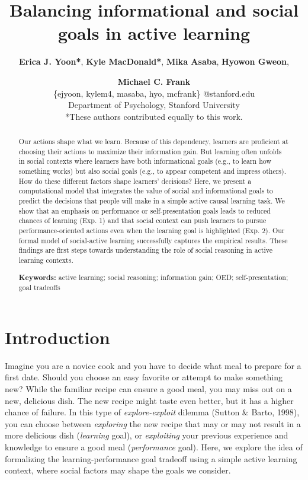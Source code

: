 \documentclass[10pt, letterpaper]{article}
\title{Balancing informational and social goals in active learning}
\author{{\large \bf Erica J. Yoon*}, {\large \bf Kyle MacDonald*}, {\large \bf Mika Asaba}, {\large \bf Hyowon Gweon}, \and {\large \bf Michael C. Frank} \\ \{ejyoon, kylem4, masaba, hyo, mcfrank\} @stanford.edu \\ Department of Psychology, Stanford University \\ *These authors contributed equally to this work.}
\begin{document}
\maketitle

\begin{abstract}
Our actions shape what we learn. Because of this dependency, learners
are proficient at choosing their actions to maximize their information
gain. But learning often unfolds in social contexts where learners have
both informational goals (e.g., to learn how something works) but also
social goals (e.g., to appear competent and impress others). How do
these different factors shape learners' decisions? Here, we present a
computational model that integrates the value of social and
informational goals to predict the decisions that people will make in a
simple active causal learning task. We show that an emphasis on
performance or self-presentation goals leads to reduced chances of
learning (Exp. 1) and that social context can push learners to pursue
performance-oriented actions even when the learning goal is highlighted
(Exp. 2). Our formal model of social-active learning successfully
captures the empirical results. These findings are first steps towards
understanding the role of social reasoning in active learning contexts.

\textbf{Keywords:}
active learning; social reasoning; information gain; OED;
self-presentation; goal tradeoffs
\end{abstract}

\section{Introduction}\label{introduction}

Imagine you are a novice cook and you have to decide what meal to
prepare for a first date. Should you choose an easy favorite or attempt
to make something new? While the familiar recipe can ensure a good meal,
you may miss out on a new, delicious dish. The new recipe might taste
even better, but it has a higher chance of failure. In this type of
\emph{explore-exploit} dilemma (Sutton \& Barto, 1998), you can choose
between \emph{exploring} the new recipe that may or may not result in a
more delicious dish (\emph{learning} goal), or \emph{exploiting} your
previous experience and knowledge to ensure a good meal
(\emph{performance} goal). Here, we explore the idea of formalizing the
learning-performance goal tradeoff using a simple active learning
context, where social factors may shape the goals we consider.
\end{document}
